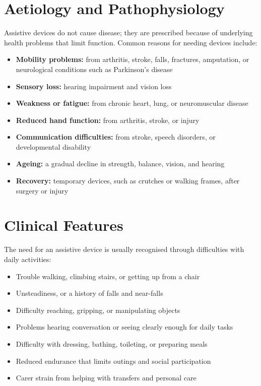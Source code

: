 \section*{Aetiology and Pathophysiology}
Assistive devices do not cause disease; they are prescribed because of underlying health problems that limit function. Common reasons for needing devices include:
\begin{itemize}
    \item \textbf{Mobility problems:} from arthritis, stroke, falls, fractures, amputation, or neurological conditions such as Parkinson's disease
    \item \textbf{Sensory loss:} hearing impairment and vision loss
    \item \textbf{Weakness or fatigue:} from chronic heart, lung, or neuromuscular disease
    \item \textbf{Reduced hand function:} from arthritis, stroke, or injury
    \item \textbf{Communication difficulties:} from stroke, speech disorders, or developmental disability
    \item \textbf{Ageing:} a gradual decline in strength, balance, vision, and hearing
    \item \textbf{Recovery:} temporary devices, such as crutches or walking frames, after surgery or injury
\end{itemize}

\section*{Clinical Features}
The need for an assistive device is usually recognised through difficulties with daily activities:
\begin{itemize}
    \item Trouble walking, climbing stairs, or getting up from a chair
    \item Unsteadiness, or a history of falls and near-falls
    \item Difficulty reaching, gripping, or manipulating objects
    \item Problems hearing conversation or seeing clearly enough for daily tasks
    \item Difficulty with dressing, bathing, toileting, or preparing meals
    \item Reduced endurance that limits outings and social participation
    \item Carer strain from helping with transfers and personal care
\end{itemize}

